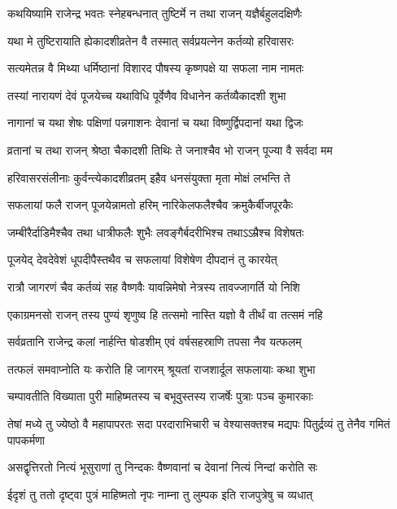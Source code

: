 
\twolineshloka
{कथयिष्यामि राजेन्द्र भवतः स्नेहबन्धनात्}
{तुष्टिर्मे न तथा राजन् यज्ञैर्बहुलदक्षिणैः}%

\twolineshloka
{यथा मे तुष्टिरायाति ह्येकादशीव्रतेन वै}
{तस्मात् सर्वप्रयत्नेन कर्तव्यो हरिवासरः}%

\twolineshloka
{सत्यमेतन्न वै मिथ्या धर्मिष्ठानां विशारद}
{पौषस्य कृष्णपक्षे या सफला नाम नामतः}%

\twolineshloka
{तस्यां नारायणं देवं पूजयेच्च यथाविधि}
{पूर्वेणैव विधानेन कर्तव्यैकादशी शुभा}%

\twolineshloka
{नागानां च यथा शेषः पक्षिणां पन्नगाशनः}
{देवानां च यथा विष्णुर्द्विपदानां यथा द्विजः}%

\twolineshloka
{व्रतानां च तथा राजन् श्रेष्ठा चैकादशी तिथिः}
{ते जनाश्चैव भो राजन् पूज्या वै सर्वदा मम}%

\twolineshloka
{हरिवासरसंलीनाः कुर्वन्त्येकादशीव्रतम्}
{इहैव धनसंयुक्ता मृता मोक्षं लभन्ति ते}%

\twolineshloka
{सफलायां फलै राजन् पूजयेन्नामतो हरिम्}
{नारिकेलफलैश्चैव क्रमुकैर्बीजपूरकैः}%

\twolineshloka
{जम्बीरैर्दाडिमैश्चैव तथा धात्रीफलैः शुभैः}
{लवङ्गैर्बदरीभिश्च तथाऽऽम्रैश्च विशेषतः}%

\twolineshloka
{पूजयेद् देवदेवेशं धूपदीपैस्तथैव च}
{सफलायां विशेषेण दीपदानं तु कारयेत्}%

\twolineshloka
{रात्रौ जागरणं चैव कर्तव्यं सह वैष्णवैः}
{यावन्निमेषो नेत्रस्य तावज्जागर्ति यो निशि}%

\twolineshloka
{एकाग्रमनसो राजन् तस्य पुण्यं शृणुष्व हि}
{तत्समो नास्ति यज्ञो वै तीर्थं वा तत्समं नहि}%

\twolineshloka
{सर्वव्रतानि राजेन्द्र कलां नार्हन्ति षोडशीम्}
{एवं वर्षसहस्राणि तपसा नैव यत्फलम्}%

\twolineshloka
{तत्फलं समवाप्नोति यः करोति हि जागरम्}
{श्रूयतां राजशार्दूल सफलायाः कथा शुभा}%

\twolineshloka
{चम्पावतीति विख्याता पुरी माहिष्मतस्य च}
{बभूवुस्तस्य राजर्षेः पुत्राः पञ्च कुमारकाः}%

\twolineshloka
{तेषां मध्ये तु ज्येष्ठो वै महापापरतः सदा}
{परदाराभिचारी च वेश्यासक्तश्च मद्यपः}%
{पितुर्द्रव्यं तु तेनैव गमितं पापकर्मणा}

\twolineshloka
{असद्वृत्तिरतो नित्यं भूसुराणां तु निन्दकः}%
{वैष्णवानां च देवानां नित्यं निन्दां करोति सः}

\twolineshloka
{ईदृशं तु ततो दृष्ट्वा पुत्रं माहिष्मतो नृपः}%
{नाम्ना तु लुम्पक इति राजपुत्रेषु च व्यधात्}

